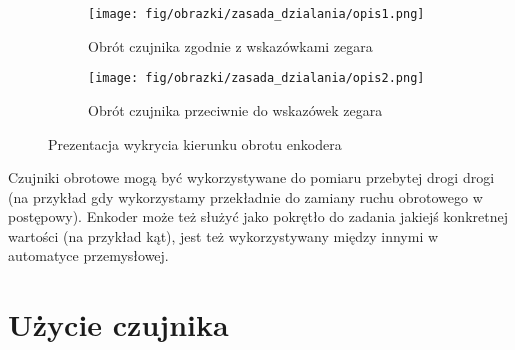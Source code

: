 \documentclass[11pt, a4paper]{article}
\begin{document}
\vspace{0.5cm}
\begin{figure}[h]
\centering
\begin{subfigure}{.5\textwidth}
  \centering
  \texttt{[image: fig/obrazki/zasada\_dzialania/opis1.png]}  
  \caption{Obrót czujnika zgodnie z wskazówkami zegara}
  \label{fig:sub1}
\end{subfigure}%
\begin{subfigure}{.5\textwidth}
  \centering
  \texttt{[image: fig/obrazki/zasada\_dzialania/opis2.png]}
  \caption{Obrót czujnika przeciwnie do wskazówek zegara}
  \label{fig:sub2}
\end{subfigure}
\caption{Prezentacja wykrycia kierunku obrotu enkodera}
\label{fig:test}
\end{figure}
\vspace{0.5cm}

Czujniki obrotowe mogą być wykorzystywane do pomiaru przebytej drogi drogi (na przykład gdy wykorzystamy przekładnie do zamiany ruchu obrotowego w postępowy). Enkoder może też służyć jako pokrętło do zadania jakiejś konkretnej wartości (na przykład kąt), jest też wykorzystywany między innymi w automatyce przemysłowej.


\newpage






\newpage

\section{Użycie czujnika}
\end{document}
